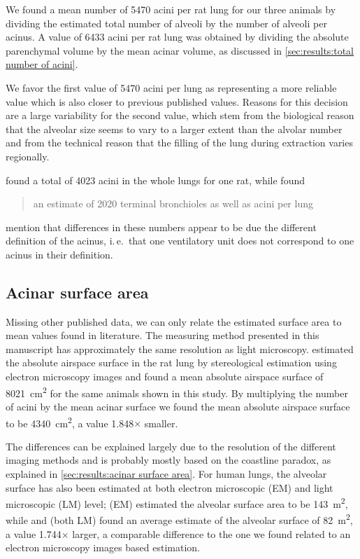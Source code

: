 \documentclass[a4paper,DIV=calc,abstract,english]{scrartcl}
\newcommand{\ie}{i.\,e.\ }
\newcommand{\meantotalnumberofacini}{6433}
\newcommand{\meantotalnumberofaciniVariant}{5470}
\newcommand{\meanairspacesurface}{4340} %
\newcommand{\airspacedifference}{1.848} %
\begin{document}
We found a mean number of \meantotalnumberofaciniVariant\xspace acini per rat lung for our three animals by dividing the estimated total number of alveoli by the number of alveoli per acinus.
A value of \meantotalnumberofacini\xspace acini per rat lung was obtained by dividing the absolute parenchymal volume by the mean acinar volume, as discussed in \autoref{sec:results:total number of acini}.

We favor the first value of \meantotalnumberofaciniVariant\xspace acini per lung as representing a more reliable value which is also closer to previous published values. Reasons for this decision are a large variability for the second value, which stem from the biological reason that the alveolar size seems to vary to a larger extent than the alvolar number and from the technical reason that the filling of the lung during extraction varies regionally.

\citet{Rodriguez1987} found a total of 4023 acini in the whole lungs for one rat, while \citet{Mercer1987a} found \blockquote{an estimate of 2020 terminal bronchioles as well as acini per lung}.
\citeauthor{Mercer1987a} mention that differences in these numbers appear to be due the different definition of the acinus, \ie that one ventilatory unit does not correspond to one acinus in their definition.

\subsection{Acinar surface area}
Missing other published data, we can only relate the estimated surface area to mean values found in literature.
The measuring method presented in this manuscript has approximately the same resolution as light microscopy.
\citet{Tschanz2003} estimated the absolute airspace surface in the rat lung by stereological estimation using electron microscopy images and found a mean absolute airspace surface of \SI{8021}{\centi\meter\squared} for the same animals shown in this study.
By multiplying the number of acini by the mean acinar surface we found the mean absolute airspace surface to be \SI{\meanairspacesurface}{\centi\meter\squared}, a value \airspacedifference\(\times\) smaller.

The differences can be explained largely due to the resolution of the different imaging methods and is probably mostly based on the coastline paradox, as explained in \autoref{sec:results:acinar surface area}.
For human lungs, the alveolar surface has also been estimated at both electron microscopic (EM) and light microscopic (LM) level; \citet{Gehr1978} (EM) estimated the alveolar surface area to be \SI{143}{\square\meter}, while \citet{Weibel1963} and \citet{Thurlbeck1967} (both LM) found an average estimate of the alveolar surface of \SI{82}{\square\meter}, a value 1.744\(\times\) larger, a comparable difference to the one we found related to an electron microscopy images based estimation.
\end{document}
